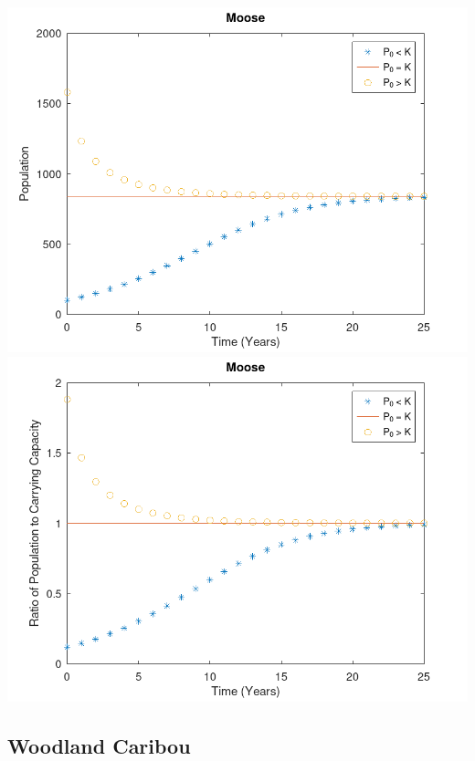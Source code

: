 \documentclass[12pt]{article}
\begin{document}
\begin{center}
  \includegraphics[width=.75\textwidth]{Images/Moose.png}
  \includegraphics[width=.75\textwidth]{Images/MooseCC.png}
\end{center}

\subsection{Woodland Caribou}
\end{document}
